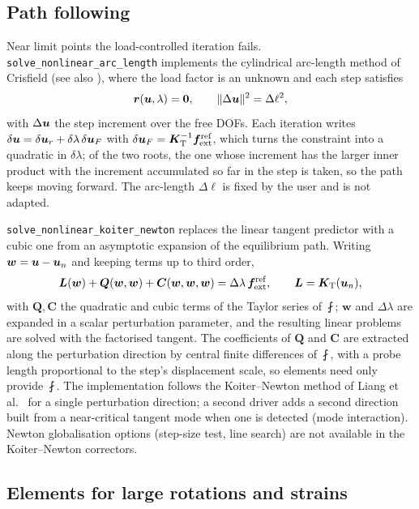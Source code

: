 \subsection{Path following}
Near limit points the load-controlled iteration fails. \texttt{solve\_nonlinear\_arc\_length} implements the cylindrical arc-length method of Crisfield \cite{crisfield1981}
(see also \cite{riks1979}), where the load factor is an unknown and each step satisfies
\begin{equation}
  \bm r(\bm{u},\lambda)=\bm 0,\qquad \|\Delta\bm{u}\|^2=\Delta\ell^2 ,
  \label{eq:arc}
\end{equation}
with $\Delta\bm{u}$ the step increment over the free DOFs. Each iteration writes $\delta\bm{u}=\delta\bm{u}_r+\delta\lambda\,\delta\bm{u}_F$ with $\delta\bm{u}_F=\bm{K}_{\mathrm{T}}^{-1}\bm{f}_{\mathrm{ext}}^{\mathrm{ref}}$,
which turns the constraint into a quadratic in $\delta\lambda$; of the two roots, the one whose increment has the larger inner product with the increment accumulated so far in the step is taken, so the path
keeps moving forward. The arc-length $\Delta\ell$ is fixed by the user and is not adapted.

\texttt{solve\_nonlinear\_koiter\_newton} replaces the linear tangent predictor with a cubic one from an asymptotic expansion of the equilibrium path. Writing $\bm w=\bm{u}-\bm{u}_n$ and keeping terms up to third order,
\begin{equation}
  \bm L(\bm w)+\bm Q(\bm w,\bm w)+\bm C(\bm w,\bm w,\bm w)=\Delta\lambda\,\bm{f}_{\mathrm{ext}}^{\mathrm{ref}},\qquad \bm L=\bm{K}_{\mathrm{T}}(\bm{u}_n),
  \label{eq:koiter}
\end{equation}
with $\bm Q,\bm C$ the quadratic and cubic terms of the Taylor series of $\fint$; $\bm w$ and $\Delta\lambda$ are expanded in a scalar perturbation parameter, and the resulting linear problems
are solved with the factorised tangent. The coefficients of $\bm Q$ and $\bm C$ are extracted along the perturbation direction by central finite differences of $\fint$, with a probe length proportional to the
step's displacement scale, so elements need only provide $\fint$. The implementation follows the Koiter--Newton method of Liang et al.\ \cite{liang2014koiternewton} for a single perturbation direction; a second
driver adds a second direction built from a near-critical tangent mode when one is detected (mode interaction). Newton globalisation options (step-size test, line search) are not available in the Koiter--Newton correctors.

\subsection{Elements for large rotations and strains}
